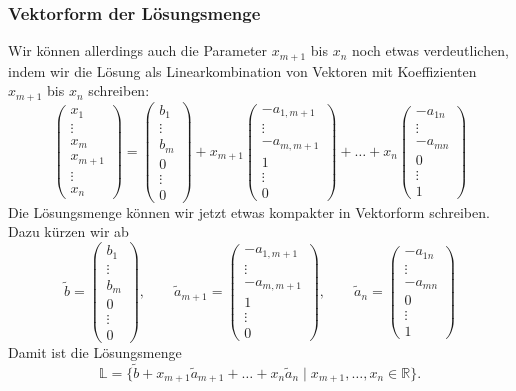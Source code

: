 \subsubsection{Vektorform der Lösungsmenge}
Wir können allerdings auch die Parameter $x_{m+1}$ bis $x_n$ noch
etwas verdeutlichen, indem wir die Lösung als Linearkombination von
Vektoren mit Koeffizienten $x_{m+1}$ bis $x_n$ schreiben:
\[
\begin{pmatrix}
x_1\\\vdots\\x_m\\x_{m+1}\\\vdots\\x_n
\end{pmatrix}
=
\begin{pmatrix}
b_1\\\vdots\\b_m\\0\\\vdots\\0
\end{pmatrix}
+x_{m+1}\begin{pmatrix}
-a_{1,m+1}\\ \vdots\\-a_{m,m+1}\\1\\\vdots\\0
\end{pmatrix}
+\dots+
x_n
\begin{pmatrix}
-a_{1n}\\
\vdots\\
-a_{mn}\\
0\\
\vdots\\
1
\end{pmatrix}
\]
Die Lösungsmenge können wir jetzt etwas kompakter in Vektorform schreiben.
Dazu kürzen wir ab
\[
\tilde b
=
\begin{pmatrix}
b_1\\\vdots\\b_m\\0\\\vdots\\0
\end{pmatrix}
,\qquad
\tilde a_{m+1}=
\begin{pmatrix}
-a_{1,m+1}\\ \vdots\\-a_{m,m+1}\\1\\\vdots\\0
\end{pmatrix}
,\qquad
\tilde a_n
=
\begin{pmatrix}
-a_{1n}\\
\vdots\\
-a_{mn}\\
0\\
\vdots\\
1
\end{pmatrix}
\]
Damit ist die Lösungsmenge
\[
\mathbb L = \{
\tilde b+x_{m+1}\tilde a_{m+1}+\dots+x_n\tilde a_n\;|\;x_{m+1},\dots,x_n\in\mathbb R\}.
\]

